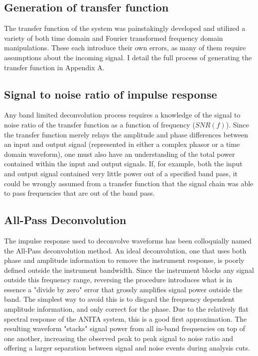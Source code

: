 	\subsection{Generation of transfer function}
		The transfer function of the system was painstakingly developed and utilized a variety of both time domain and Fourier transformed frequency domain manipulations.  These each introduce their own errors, as many of them require assumptions about the incoming signal.  I detail the full process of generating the transfer function in Appendix A.


	\subsection{Signal to noise ratio of impulse response}
		Any band limited deconvolution process requires a knowledge of the signal to noise ratio of the transfer function as a function of frequency ($SNR(f)$).  Since the transfer function merely relays the amplitude and phase differences between an input and output signal (represented in either a complex phasor or a time domain waveform), one must also have an understanding of the total power contained within the input and output signals.  If, for example, both the input and output signal contained very little power out of a specified band pass, it could be wrongly assumed from a transfer function that the signal chain was able to pass frequencies that are out of the band pass.
		
		
	\subsection{All-Pass Deconvolution}
		The impulse response used to deconvolve waveforms has been colloquially named the All-Pass deconvolution method.  An ideal deconvolution, one that uses both phase and amplitude information to remove the instrument response, is poorly defined outside the instrument bandwidth.  Since the instrument blocks any signal outside this frequency range, reversing the procedure introduces what is in essence a "divide by zero" error that grossly amplifies signal power outside the band.  The simplest way to avoid this is to disgard the frequency dependent amplitude information, and only correct for the phase.  Due to the relatively flat spectral response of the ANITA system, this is a good first approximation.  The resulting waveform "stacks" signal power from all in-band frequencies on top of one another, increasing the observed peak to peak signal to noise ratio and offering a larger separation between signal and noise events during analysis cuts.



